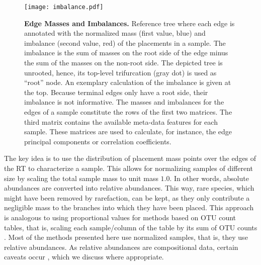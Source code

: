 \begin{figure}[!ht]
    \centering
    \texttt{[image: imbalance.pdf]}
    \begin{subfigure}{0pt}
        \label{fig:imbalance:sub:ReferenceTree}
    \end{subfigure}
    \begin{subfigure}{0pt}
        \label{fig:imbalance:sub:Matrices}
    \end{subfigure}
    \caption[Edge Masses and Imbalances]{
        \textbf{Edge Masses and Imbalances.}
        Reference tree where each edge is annotated with the normalized mass (first value, blue) and
        imbalance (second value, red) of the placements in a sample.
        The imbalance is the sum of masses on the root side of the edge minus the sum of the masses on the non-root side.
        The depicted tree is unrooted, hence, its top-level trifurcation (gray dot) is used as ``root'' node.
        An exemplary calculation of the imbalance is given at the top.
        Because terminal edges only have a root side, their imbalance is not informative.
        The masses and imbalances for the edges of a sample constitute the rows of the first two matrices.
        The third matrix contains the available meta-data features for each sample.
        These matrices are used to calculate, for instance, the edge principal components or correlation coefficients.
    }
    \label{fig:imbalance}
\end{figure}

The key idea is to use the distribution of placement mass points over the edges of the \ac{RT} to characterize a sample.
This allows for normalizing samples of different size
by scaling the total sample mass to unit mass $1.0$.
In other words, absolute abundances are converted into relative abundances.
This way, rare species, which might have been removed by rarefaction, can be kept,
as they only contribute a negligible mass to the branches into which they have been placed.
This approach is analogous to using proportional values for methods based on OTU count tables,
that is, scaling each sample/column of the table by its sum of OTU counts \cite{Weiss2017}.
Most of the methods presented here use normalized samples, that is, they use relative abundances.
As relative abundances are compositional data, certain caveats occur \cite{Aitchison1986,Lovell2015},
which we discuss where appropriate.

